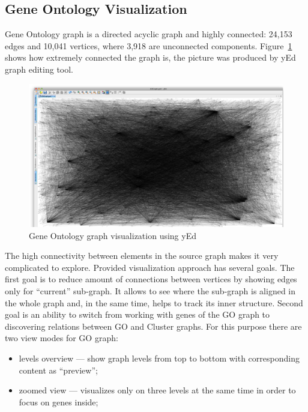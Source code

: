 \subsection{Gene Ontology Visualization}
\label{sec:go}

Gene Ontology graph is a directed acyclic graph and highly connected: 24,153 edges and 10,041 vertices, where 3,918 are unconnected components.
Figure~\ref{fig:go_connections_yEd} shows how extremely connected the graph is, the picture was produced by yEd graph editing tool.

\begin{figure}
\centering
\includegraphics[scale=0.2]{pictures/yEd_GO_2.png}
\caption{Gene Ontology graph visualization using yEd}
\label{fig:go_connections_yEd}
\end{figure}

The high connectivity between elements in the source graph makes it very complicated to explore. Provided visualization approach has several goals.
The first goal is to reduce amount of connections between vertices by showing edges only for ``current'' sub-graph.
It allows to see where the sub-graph is aligned in the whole graph and, in the same time, helps to track its inner structure.
Second goal is an ability to switch from working with genes of the GO graph to discovering relations between GO and Cluster graphs.
For this purpose there are two view modes for GO graph:

\begin{itemize}
   \item levels overview --- show graph levels from top to bottom with corresponding content as ``preview'';
   \item zoomed view --- visualizes only on three levels at the same time in order to focus on genes inside;
\end{itemize}

